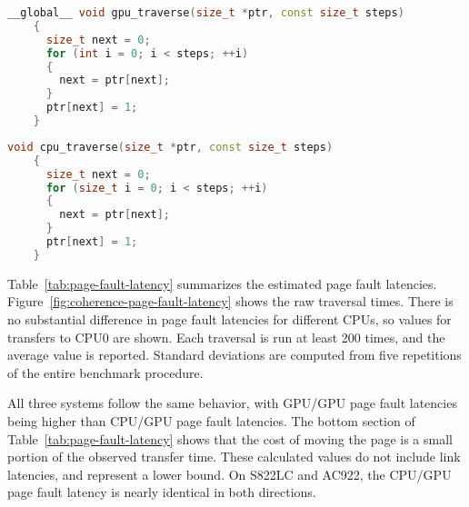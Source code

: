 \begin{lstlisting}[language=c++, caption=GPU Linked List Traversal Kernel for Algorithm~\ref{alg:um-latency-gpu}, label=lst:gpu-traversal]
	__global__ void gpu_traverse(size_t *ptr, const size_t steps)
	{
	  size_t next = 0;
	  for (int i = 0; i < steps; ++i)
	  {
		next = ptr[next];
	  }
	  ptr[next] = 1;
	}
	\end{lstlisting}
	
	\begin{lstlisting}[language=c++, caption=CPU Linked List Traversal Function for Algorithm~\ref{alg:um-latency-cpu}, label=lst:cpu-traversal]
	void cpu_traverse(size_t *ptr, const size_t steps)
	{
	  size_t next = 0;
	  for (size_t i = 0; i < steps; ++i)
	  {
		next = ptr[next];
	  }
	  ptr[next] = 1;
	}
	\end{lstlisting}

Table~\ref{tab:page-fault-latency} summarizes the estimated page fault latencies.
Figure~\ref{fig:coherence-page-fault-latency} shows the raw traversal times.
There is no substantial difference in page fault latencies for different CPUs, so values for transfers to CPU0 are shown.
Each traversal is run at least 200 times, and the average value is reported.
Standard deviations are computed from five repetitions of the entire benchmark procedure.

All three systems follow the same behavior, with GPU/GPU page fault latencies being higher than CPU/GPU page fault latencies.
The bottom section of Table~\ref{tab:page-fault-latency} shows that the cost of moving the page is a small portion of the observed transfer time.
These calculated values do not include link latencies, and represent a lower bound.
On S822LC and AC922, the CPU/GPU page fault latency is nearly identical in both directions.


